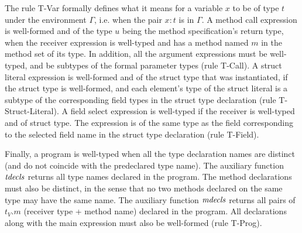 The rule T-Var formally defines what it means for a variable $x$ to be of type
$t$ under the environment $\Gamma$, i.e. when the pair $x : t$ is in $\Gamma$. A
method call expression is well-formed and of the type $u$ being the method
specification's return type, when the receiver expression is well-typed and has
a method named $m$ in the method set of its type. In addition, all the argument
expressions must be well-typed, and be subtypes of the formal parameter types
(rule T-Call). A struct literal expression is well-formed and of the struct type
that was instantiated, if the struct type is well-formed, and each element's
type of the struct literal is a subtype of the corresponding field types in the
struct type declaration (rule T-Struct-Literal). A field select expression is
well-typed if the receiver is well-typed and of struct type. The expression is
of the same type as the field corresponding to the selected field name in the
struct type declaration (rule T-Field).

Finally, a program is well-typed when all the type declaration names are
distinct (and do not coincide with the predeclared  type name). The
auxiliary function $\mathit{tdecls}$ returns all type names declared in the program. The
method declarations must also be distinct, in the sense that no two methods
declared on the same type may have the same name. The auxiliary function
$\mathit{mdecls}$ returns all pairs of $t_V.m$ (receiver type + method name) declared in
the program. All declarations along with the main expression must also be
well-formed (rule T-Prog).
